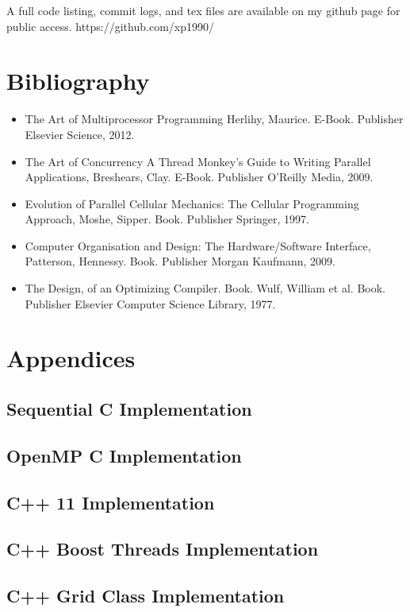 \documentclass[11pt]{article} %
\begin{document}
A full code listing, commit logs, and tex files are available on my github page for public access. https://github.com/xp1990/
\pagebreak
\section{Bibliography}
\begin{itemize}
\item The Art of Multiprocessor Programming Herlihy, Maurice. E-Book. Publisher Elsevier Science, 2012.
\item The Art of Concurrency A Thread Monkey’s Guide to Writing Parallel Applications, Breshears, Clay. E-Book. Publisher O'Reilly Media, 2009.
\item Evolution of Parallel Cellular Mechanics: The Cellular Programming Approach, Moshe, Sipper. Book. Publisher Springer, 1997.
\item Computer Organisation and Design: The Hardware/Software Interface, Patterson, Hennessy. Book. Publisher Morgan Kaufmann, 2009.
\item The Design, of an Optimizing Compiler. Book. Wulf, William et al. Book. Publisher Elsevier Computer Science Library, 1977.
\end{itemize}
\nocite{*}


\pagebreak
\appendix
\pagebreak
\section{Appendices}
\subsection{Sequential C Implementation}

\pagebreak
\subsection{OpenMP C Implementation}

\pagebreak
\subsection{C++ 11 Implementation}

\pagebreak
\subsection{C++ Boost Threads Implementation}

\pagebreak
\subsection{C++ Grid Class Implementation}

\pagebreak
\end{document}
